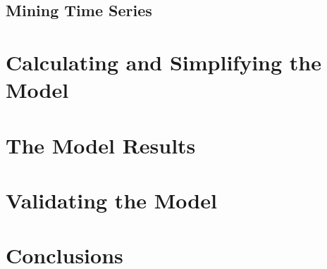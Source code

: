 \documentclass{mcmthesis}
\begin{document}
\subsection{Mining Time Series}



\iffalse
\[
  \begin{pmatrix}{*{20}c}
  {a_{11} } & {a_{12} } & {a_{13} }  \\
  {a_{21} } & {a_{22} } & {a_{23} }  \\
  {a_{31} } & {a_{32} } & {a_{33} }  \\
  \end{pmatrix}
  = \frac{{Opposite}}{{Hypotenuse}}\cos ^{ - 1} \theta \arcsin \theta
\]


\[
  p_{j}=\begin{cases} 0,&\text{if $j$ is odd}\\
  r!\,(-1)^{j/2},&\text{if $j$ is even}
  \end{cases}
\]


\[
  \arcsin \theta  =
  \mathop{{\int\!\!\!\!\!\int\!\!\!\!\!\int}\mkern-31.2mu
  \bigodot}\limits_\varphi
  {\mathop {\lim }\limits_{x \to \infty } \frac{{n!}}{{r!\left( {n - r}
  \right)!}}} 
\]
\fi



\section{Calculating and Simplifying the Model  }


\section{The Model Results}
\lipsum[6]

\section{Validating the Model}
\lipsum[9]

\section{Conclusions}
\lipsum[6]
\end{document}
